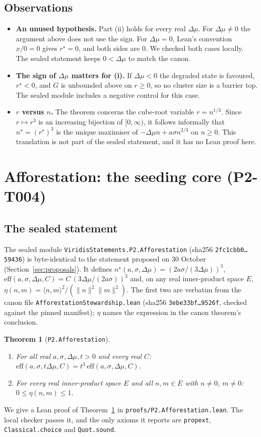 \documentclass[11pt]{article}
\newtheorem{theorem}{Theorem}
\theoremstyle{definition}
\theoremstyle{remark}
\begin{document}
\subsection{Observations}
\begin{itemize}
\item \textbf{An unused hypothesis.} Part (ii) holds for every real $\Delta\mu$. For $\Delta\mu\ne0$ the argument above
does not use the sign. For $\Delta\mu=0$, Lean's convention $x/0=0$ gives $r^\star=0$, and both sides are $0$.
We checked both cases locally. The sealed statement keeps $0<\Delta\mu$ to match the canon.
\item \textbf{The sign of $\Delta\mu$ matters for (i).} If $\Delta\mu<0$ the degraded state is favoured, $r^\star<0$, and
$G$ is unbounded above on $r\ge0$, so no cluster size is a barrier top. The sealed module includes a negative control for this case.
\item \textbf{$r$ versus $n$.} The theorem concerns the cube-root variable $r=n^{1/3}$. Since $r\mapsto r^3$ is an increasing
bijection of $[0,\infty)$, it follows informally that $n^\star=(r^\star)^3$ is the unique maximiser of
$-\Delta\mu n+a\sigma n^{2/3}$ on $n\ge0$. This translation is not part of the sealed statement, and it has no Lean proof here.
\end{itemize}

\section{Afforestation: the seeding core (P2-T004)}\label{sec:afforestation}
\subsection{The sealed statement}
The sealed module \texttt{ViridisStatements.P2.Afforestation} (sha256 \texttt{2fc1cbb0\ldots 59436}) is byte-identical to the
statement proposed on 30 October (Section~\ref{sec:proposals}).
It defines $n^\star(a,\sigma,\Delta\mu)=(2a\sigma/(3\Delta\mu))^3$, $\mathrm{eff}(a,\sigma,\Delta\mu,C)=C\,(3\Delta\mu/(2a\sigma))^3$
and, on any real inner-product space $E$, $\eta(n,m)=\langle n,m\rangle^2/(\|n\|^2\|m\|^2)$.
The first two are verbatim from the canon file \texttt{AfforestationStewardship.lean} (sha256 \texttt{3ebe33bf\ldots 9526f},
checked against the pinned manifest); $\eta$ names the expression in the canon theorem's conclusion.
\begin{theorem}[\texttt{P2.Afforestation}]\label{thm:afforestation}
\begin{enumerate}
\item[(i)] For all real $a,\sigma,\Delta\mu,t>0$ and every real $C$:
$\mathrm{eff}(a,\sigma,t\Delta\mu,C)=t^3\,\mathrm{eff}(a,\sigma,\Delta\mu,C)$.
\item[(ii)] For every real inner-product space $E$ and all $n,m\in E$ with $n\ne0$, $m\ne0$: $0\le\eta(n,m)\le1$.
\end{enumerate}
\end{theorem}
We give a Lean proof of Theorem~\ref{thm:afforestation} in \texttt{proofs/P2.Afforestation.lean}.
The local checker passes it, and the only axioms it reports are \texttt{propext}, \texttt{Classical.choice} and \texttt{Quot.sound}.
\end{document}
